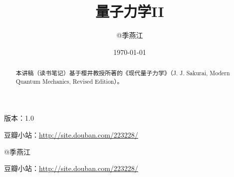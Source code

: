 \documentclass[twoside,a5paper,11pt]{article}
\title{量子力学II}
\author{@季燕江}
\date{\today}                                           %
\begin{document}
\pagestyle{headings}

\maketitle


\begin{abstract}

本讲稿（读书笔记）基于樱井教授所著的《现代量子力学》（J. J. Sakurai, Modern Quantum Mechanics, Revised Edition）。

\end{abstract}


版本：1.0

豆瓣小站：\url{http://site.douban.com/223228/}


























\printindex

@季燕江

豆瓣小站：\url{http://site.douban.com/223228/}
\end{document}

